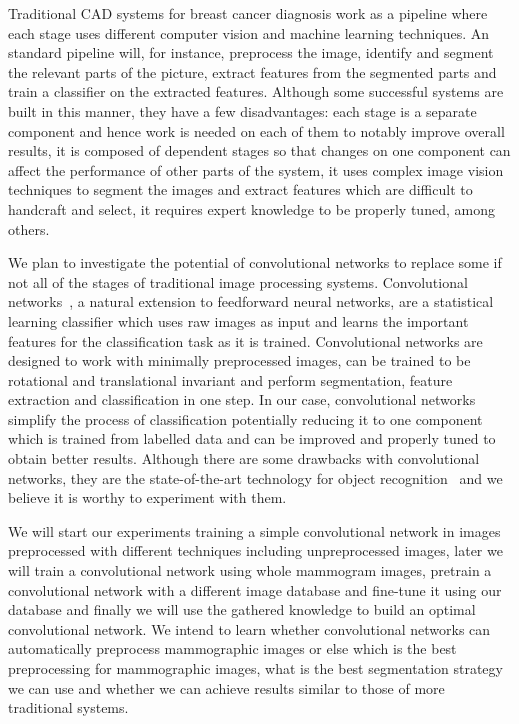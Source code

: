 Traditional CAD systems for breast cancer diagnosis work as a pipeline where each stage uses different computer vision and machine learning techniques. An standard pipeline will, for instance, preprocess the image, identify and segment the relevant parts of the picture, extract features from the segmented parts and train a classifier on the extracted features. Although some successful systems are built in this manner, they have a few disadvantages: each stage is a separate component and hence work is needed on each of them to notably improve overall results, it is composed of dependent stages so that changes on one component can affect the performance of other parts of the system, it uses complex image vision techniques to segment the images and extract features which are difficult to handcraft and select, it requires expert knowledge to be properly tuned, among others.

We plan to investigate the potential of convolutional networks to replace some if not all of the stages of traditional image processing systems. Convolutional networks~\cite{Fukushima1980,LeCun1998}, a natural extension to feedforward neural networks, are a statistical learning classifier which uses raw images as input and learns the important features for the classification task as it is trained. Convolutional networks are designed to work with minimally preprocessed images, can be trained to be rotational and translational invariant and perform segmentation, feature extraction and classification in one step. In our case, convolutional networks simplify the process of classification potentially reducing it to one component which is trained from labelled data and can be improved and properly tuned to obtain better results. Although there are some drawbacks with convolutional networks, they are the state-of-the-art technology for object recognition~\cite{Russakovsky2014} and we believe it is worthy to experiment with them.


We will start our experiments training a simple convolutional network in images preprocessed with different techniques including unpreprocessed images, later we will train a convolutional network using whole mammogram images, pretrain a convolutional network with a different image database and fine-tune it using our database and finally we will use the gathered knowledge to build an optimal convolutional network. We intend to learn whether convolutional networks can automatically preprocess mammographic images or else which is the best preprocessing for mammographic images, what is the best segmentation strategy we can use and whether we can achieve results similar to those of more traditional systems.

